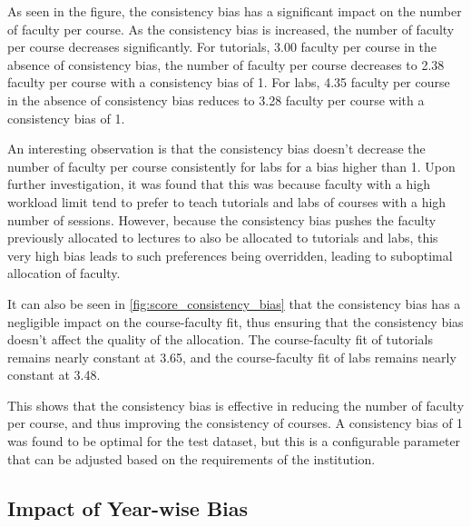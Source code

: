 As seen in the figure, the consistency bias has a significant impact on the number of faculty per course. As the consistency bias is increased, the number of faculty per course decreases significantly. For tutorials, 3.00 faculty per course in the absence of consistency bias, the number of faculty per course decreases to 2.38 faculty per course with a consistency bias of 1. For labs, 4.35 faculty per course in the absence of consistency bias reduces to 3.28 faculty per course with a consistency bias of 1.

An interesting observation is that the consistency bias doesn't decrease the number of faculty per course consistently for labs for a bias higher than 1. Upon further investigation, it was found that this was because faculty with a high workload limit tend to prefer to teach tutorials and labs of courses with a high number of sessions. However, because the consistency bias pushes the faculty previously allocated to lectures to also be allocated to tutorials and labs, this very high bias leads to such preferences being overridden, leading to suboptimal allocation of faculty.

It can also be seen in \autoref{fig:score_consistency_bias} that the consistency bias has a negligible impact on the course-faculty fit, thus ensuring that the consistency bias doesn't affect the quality of the allocation. The course-faculty fit of tutorials remains nearly constant at 3.65, and the course-faculty fit of labs remains nearly constant at 3.48.

This shows that the consistency bias is effective in reducing the number of faculty per course, and thus improving the consistency of courses. A consistency bias of 1 was found to be optimal for the test dataset, but this is a configurable parameter that can be adjusted based on the requirements of the institution.

\subsection{Impact of Year-wise Bias}

